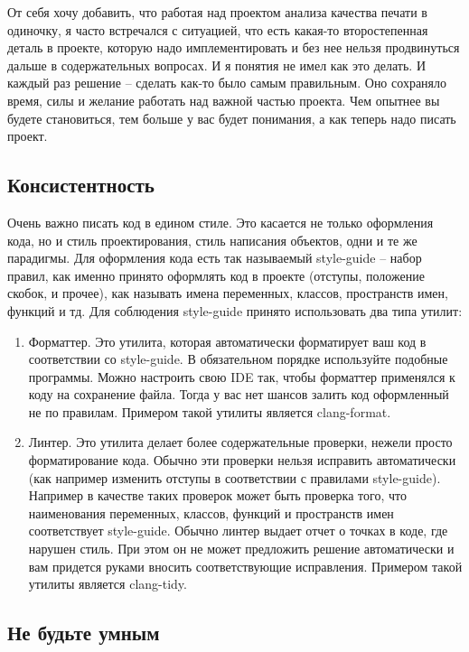 От себя хочу добавить, что работая над проектом анализа качества печати в одиночку, я часто встречался с ситуацией, что есть какая-то второстепенная деталь в проекте, которую надо имплементировать и без нее нельзя продвинуться дальше в содержательных вопросах.
И я понятия не имел как это делать.
И каждый раз решение -- сделать как-то было самым правильным.
Оно сохраняло время, силы и желание работать над важной частью проекта.
Чем опытнее вы будете становиться, тем больше у вас будет понимания, а как теперь надо писать проект.

\subsection{Консистентность}
\label{section::Consistency}

Очень важно писать код в едином стиле.
Это касается не только оформления кода, но и стиль проектирования, стиль написания объектов, одни и те же парадигмы.
Для оформления кода есть так называемый style-guide -- набор правил, как именно принято оформлять код в проекте (отступы, положение скобок, и прочее), как называть имена переменных, классов, пространств имен, функций и тд.
Для соблюдения style-guide принято использовать два типа утилит:
\begin{enumerate}
\item Форматтер.
Это утилита, которая автоматически форматирует ваш код в соответствии со style-guide.
В обязательном порядке используйте подобные программы.
Можно настроить свою IDE так, чтобы форматтер применялся к коду на сохранение файла.
Тогда у вас нет шансов залить код оформленный не по правилам.
Примером такой утилиты является clang-format.

\item Линтер.
Это утилита делает более содержательные проверки, нежели просто форматирование кода.
Обычно эти проверки нельзя исправить автоматически (как например изменить отступы в соответствии с правилами style-guide).
Например в качестве таких проверок может быть проверка того, что наименования переменных, классов, функций и пространств имен соответствует style-guide.
Обычно линтер выдает отчет о точках в коде, где нарушен стиль.
При этом он не может предложить решение автоматически и вам придется руками вносить соответствующие исправления.
Примером такой утилиты является clang-tidy.
\end{enumerate}

\subsection{Не будьте умным}
\label{section::NoClever}

